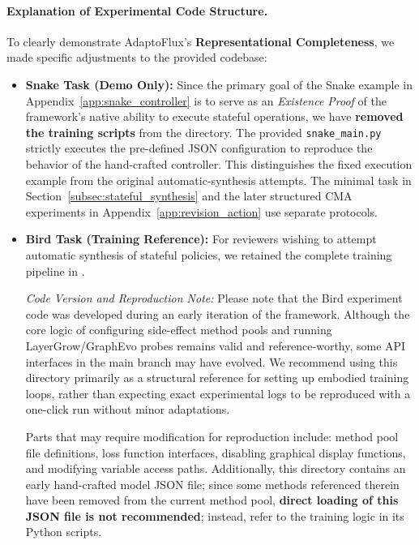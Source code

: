 \paragraph{Explanation of Experimental Code Structure.}
To clearly demonstrate AdaptoFlux's \textbf{Representational Completeness}, we made specific adjustments to the provided codebase:
\begin{itemize}
    \item \textbf{Snake Task (Demo Only):} Since the primary goal of the Snake example in Appendix~\ref{app:snake_controller} is to serve as an \textit{Existence Proof} of the framework's native ability to execute stateful operations, we have \textbf{removed the training scripts} from the  directory. The provided \texttt{snake\_main.py} strictly executes the pre-defined JSON configuration to reproduce the behavior of the hand-crafted controller. This distinguishes the fixed execution example from the original automatic-synthesis attempts. The minimal task in Section~\ref{subsec:stateful_synthesis} and the later structured CMA experiments in Appendix~\ref{app:revision_action} use separate protocols.
    
    \item \textbf{Bird Task (Training Reference):} For reviewers wishing to attempt automatic synthesis of stateful policies, we retained the complete training pipeline in .
    
    \textit{Code Version and Reproduction Note:} 
    Please note that the Bird experiment code was developed during an early iteration of the framework. Although the core logic of configuring side-effect method pools and running LayerGrow/GraphEvo probes remains valid and reference-worthy, some API interfaces in the main branch may have evolved. We recommend using this directory primarily as a structural reference for setting up embodied training loops, rather than expecting exact experimental logs to be reproduced with a one-click run without minor adaptations.
    
    Parts that may require modification for reproduction include: method pool file definitions, loss function interfaces, disabling graphical display functions, and modifying variable access paths. Additionally, this directory contains an early hand-crafted model JSON file; since some methods referenced therein have been removed from the current method pool, \textbf{direct loading of this JSON file is not recommended}; instead, refer to the training logic in its Python scripts.
\end{itemize}

